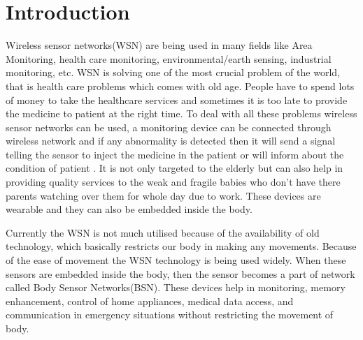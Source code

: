 \documentclass[conference]{IEEEtran}
\begin{document}
\section{Introduction}
\begin{flushleft}
Wireless sensor networks(WSN) are being used in many fields like Area Monitoring, health care monitoring, environmental/earth sensing, industrial monitoring, etc. WSN is solving one of the most crucial problem of the world, that is health care problems which comes with old age. People have to spend lots of money to take the healthcare services and sometimes it is too late to provide the medicine to patient at the right time. To deal with all these problems wireless sensor networks can be used, a monitoring device can be connected through wireless network and if any abnormality is detected then it will send a signal telling the sensor to inject the medicine in the patient or will inform about the condition of patient \cite{WSNHM}. It is not only targeted to the elderly but can also help in providing quality services to the weak and fragile babies who don't have there parents watching over them for whole day due to work. These devices are wearable\cite{SWBS} and they can also be embedded inside the body.
\end{flushleft}
\begin{flushleft}
Currently the WSN is not much utilised because of the availability of old technology, which basically restricts our body in making any movements. Because of the ease of movement the WSN technology is being used widely. When these sensors are embedded inside the body, then the sensor becomes a part of network called Body Sensor Networks(BSN)\cite{HHMSWSN}. These devices help in monitoring, memory enhancement, control of home appliances, medical data access, and communication in emergency situations without restricting the movement of body.
\end{flushleft}
\end{document}
